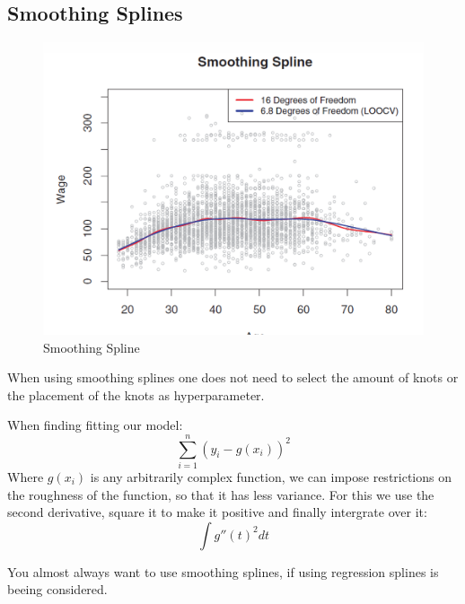 \documentclass[../Main.tex]{subfiles}
\begin{document}
\subsection{Smoothing Splines}

\begin{figure}[H]
    \centering
    \includegraphics[width=0.5\linewidth]{Images/smoothing-spline.png}
    \caption{Smoothing Spline}
\end{figure}

When using smoothing splines one does not need to select the amount of knots
or the placement of the knots as hyperparameter.

When finding fitting our model:
\begin{equation*}
    \sum_{i=1}^{n} (y_i - g(x_i))^2
\end{equation*}
Where \(g(x_i)\) is any arbitrarily complex function,
we can impose restrictions on the roughness of the function,
so that it has less variance. For this we use the second
derivative, square it to make it positive and finally intergrate over it:
\begin{equation*}
    \int g''(t)^2 dt
\end{equation*}

You almost always want to use smoothing splines, if using regression splines is beeing considered.
\end{document}
